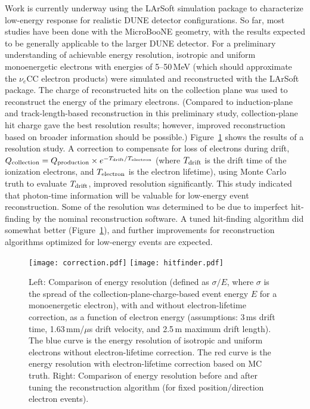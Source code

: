 Work is currently underway using the LArSoft simulation package to
characterize low-energy response for realistic DUNE detector
configurations.
So far, most studies have been done with the MicroBooNE geometry, with
the results expected to be generally applicable to the larger DUNE
detector.  For a preliminary understanding of achievable energy
resolution, isotropic and uniform monoenergetic electrons with
energies of 5--50\,MeV (which should approximate the $\nu_e$CC
electron products) were simulated and reconstructed with the LArSoft
package.  The charge of reconstructed hits on the collection plane was
used to reconstruct the energy of the primary electrons. (Compared to induction-plane 
and track-length-based reconstruction in
 this preliminary study, collection-plane hit charge gave the best resolution results;
 however, improved reconstruction based on
  broader information should be possible.)
Figure~\ref{fig:lowe_res} shows the results of a resolution study.  
A correction to compensate for loss of electrons during
drift, $Q_{\rm collection}=Q_{\rm production}\times e^{-T_{\rm drift} / T_{\rm
    electron}}$ (where $T_{\rm drift}$ is the drift time of the ionization
electrons, and $T_{\rm electron}$ is the electron lifetime), using Monte
Carlo truth to evaluate $T_{\rm drift}$, improved resolution
significantly.  This study indicated that photon-time information will
be valuable for low-energy event reconstruction.  Some of the
resolution was determined to be due to imperfect hit-finding by the
nominal reconstruction software.  A tuned hit-finding algorithm did
somewhat better (Figure~\ref{fig:lowe_res}), and further improvements
for reconstruction algorithms optimized for low-energy events are
expected.
\begin{figure}[!htb] %
 \centering
\texttt{[image: correction.pdf]} 
\texttt{[image: hitfinder.pdf]} 
 \caption[Comparisons of energy resolution]{Left: Comparison of energy
   resolution (defined as $\sigma/E$, where $\sigma$ is the spread of
   the collection-plane-charge-based event energy $E$ for a
   monoenergetic electron), with and without electron-lifetime
   correction, as a function of electron energy (assumptions: 3\,ms
   drift time, 1.63\,mm/$\mu$s drift velocity, and 2.5\,m maximum drift
   length). The blue curve is the energy resolution of isotropic and
   uniform electrons without electron-lifetime correction. The red
   curve is the energy resolution with electron-lifetime correction
   based on MC truth.  Right: Comparison of energy resolution before
   and after tuning the reconstruction algorithm (for fixed
   position/direction electron events).}\label{fig:lowe_res}
\end{figure}

